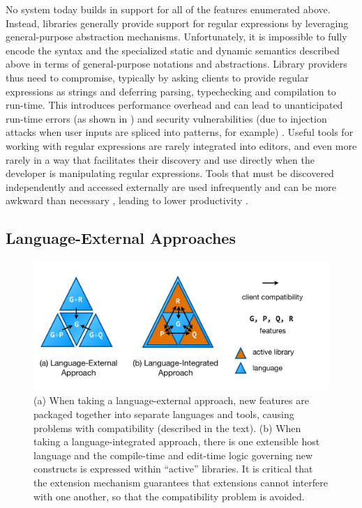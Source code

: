 No system today builds in support for all of the features enumerated above. Instead, libraries generally provide support for regular expressions by leveraging  general-purpose abstraction mechanisms. Unfortunately, it is impossible to fully encode the syntax and the specialized static and dynamic semantics described above in terms of general-purpose notations and abstractions. Library providers thus need to compromise, typically by asking clients to provide regular expressions as strings and deferring parsing, typechecking and compilation to run-time. This introduces performance overhead and can lead to unanticipated run-time errors (as shown in \cite{spishak2012type}) and security vulnerabilities (due to injection attacks when user inputs are spliced into patterns, for example) \cite{string-stuff}. Useful tools for working with regular expressions are rarely integrated into editors, and even more rarely in a way that facilitates their discovery and use directly when the developer is manipulating regular expressions. Tools that must be discovered independently and accessed externally are used infrequently \cite{emersonStudy} and can be more awkward than necessary \cite{Campbell:2008:DRT:1636642.1636651, Omar:2012:ACC:2337223.2337324}, leading to lower productivity \cite{emersonStudy, Omar:2012:ACC:2337223.2337324}.

\subsection{Language-External Approaches}\label{external-approaches}
\begin{figure}
\begin{center}
\includegraphics[scale=.48]{approaches.pdf}
\end{center}
\vspace{-20px}
\caption{\small (a) When taking a language-external approach, new features are packaged together into separate languages and tools, causing problems with compatibility (described in the text). (b) When taking a language-integrated approach, there is one extensible host language and the compile-time and edit-time logic governing new constructs is expressed within ``active'' libraries. It is critical that the extension mechanism  guarantees that extensions cannot interfere with one another, so that the compatibility problem is avoided.}
\label{approaches}
\end{figure}

